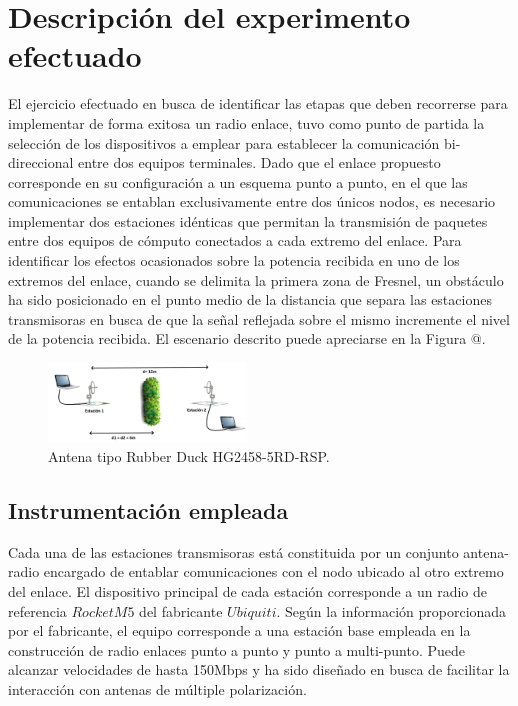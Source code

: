 \documentclass[conference]{IEEEtran}
\begin{document}
\section{Descripción del experimento efectuado}
El ejercicio efectuado en busca de identificar las etapas que deben recorrerse para implementar de forma exitosa un radio enlace, tuvo como 
punto de partida la selección de los dispositivos a emplear para establecer la comunicación bi-direccional entre dos equipos terminales. Dado que el 
enlace propuesto corresponde en su configuración a un esquema punto a punto, en el que las comunicaciones se entablan exclusivamente entre dos
únicos nodos, es necesario implementar dos estaciones idénticas que permitan la transmisión de paquetes entre dos equipos de cómputo conectados
a cada extremo del enlace. Para identificar los efectos ocasionados sobre la potencia recibida en uno de los extremos del enlace, cuando se delimita
la primera zona de Fresnel, un obstáculo ha sido posicionado en el punto medio de la distancia que separa las estaciones transmisoras en busca de que
la señal reflejada sobre el mismo incremente el nivel de la potencia recibida. El escenario descrito puede apreciarse en la Figura @.
\begin{figure}
    \centering
          \includegraphics[width=0.47\textwidth]{Escenario.png}
        \caption{Antena tipo Rubber Duck HG2458-5RD-RSP.
        }
        \label{fig:Escenario}
\end{figure}
\subsection{Instrumentación empleada}
Cada una de las estaciones transmisoras está constituida por un conjunto antena-radio encargado de entablar comunicaciones con el nodo ubicado al 
otro extremo del enlace. El dispositivo principal de cada estación corresponde a un radio de referencia $Rocket M5$ del fabricante $Ubiquiti$. Según la 
información proporcionada por el fabricante, el equipo corresponde a una estación base empleada en la construcción de radio enlaces punto a punto y
punto a multi-punto. Puede alcanzar velocidades de hasta 150Mbps y ha sido diseñado en busca de facilitar la interacción con antenas de múltiple polarización.
\end{document}
